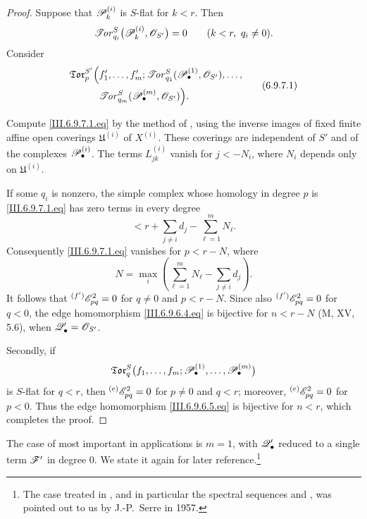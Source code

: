 \begin{proof}
Suppose that $\mathscr{P}_k^{(i)}$ is $S$-flat for $k<r$.  Then
\[
  \mathscr{T}\!\mathit{or}_{q_i}^S
  \bigl(
    \mathscr{P}_k^{(i)},\mathscr{O}_{S'}
  \bigr)
  =
  0
  \qquad
  (k<r,\ q_i\neq0).
\]
Consider
\[
\begin{split}
  \mathfrak{Tor}_p^{S'}
  \Bigl(
    &
    f_1',\ldots,f_m';
    \mathscr{T}\!\mathit{or}_{q_1}^S
    (\mathscr{P}_\bullet^{(1)},\mathscr{O}_{S'}),\ldots,
    \\
    &
    \mathscr{T}\!\mathit{or}_{q_m}^S
    (\mathscr{P}_\bullet^{(m)},\mathscr{O}_{S'})
  \Bigr).
\end{split}
  \tag{6.9.7.1}\label{III.6.9.7.1.eq}
\]


Compute \eqref{III.6.9.7.1.eq} by the method of
, using the inverse images of fixed finite affine
open coverings $\mathfrak U^{(i)}$ of $X^{(i)}$.  These coverings
are independent of $S'$ and of the complexes
$\mathscr{P}_\bullet^{(i)}$.  The terms $L_{jk}^{(i)}$ vanish for
$j<-N_i$, where $N_i$ depends only on $\mathfrak U^{(i)}$.

If some $q_i$ is nonzero, the simple complex whose homology in
degree $p$ is \eqref{III.6.9.7.1.eq} has zero terms in every degree
\[
  <
  r+\sum_{j\neq i}d_j-\sum_{\ell=1}^mN_\ell.
\]
Consequently \eqref{III.6.9.7.1.eq} vanishes for $p<r-N$, where
\[
  N
  =
  \max_i
  \left(
    \sum_{\ell=1}^mN_\ell-\sum_{j\neq i}d_j
  \right).
\]
It follows that
${}^{(f')}\mathscr{E}_{pq}^2=0$ for $q\neq0$ and $p<r-N$.
Since also ${}^{(f')}\mathscr{E}_{pq}^2=0$ for $q<0$, the edge
homomorphism \eqref{III.6.9.6.4.eq} is bijective for $n<r-N$
(M, XV, 5.6), when $\mathscr{Q}_\bullet'=\mathscr{O}_{S'}$.

Secondly, if
\[
  \mathfrak{Tor}_q^S
  \bigl(
    f_1,\ldots,f_m;
    \mathscr{P}_\bullet^{(1)},\ldots,\mathscr{P}_\bullet^{(m)}
  \bigr)
\]
is $S$-flat for $q<r$, then
${}^{(e)}\mathscr{E}_{pq}^2=0$ for $p\neq0$ and $q<r$; moreover,
${}^{(e)}\mathscr{E}_{pq}^2=0$ for $p<0$.  Thus the edge homomorphism
\eqref{III.6.9.6.5.eq} is bijective for $n<r$, which completes the
proof.
\end{proof}

The case of  most important in applications is
$m=1$, with $\mathscr{Q}_\bullet'$ reduced to a single term $\mathscr{F}'$ in
degree $0$.  We state it again for later reference.\footnote{The
case treated in , and in particular the spectral
sequences  and , was pointed
out to us by J.-P.~Serre in 1957.}

